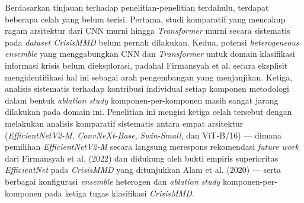 Berdasarkan tinjauan terhadap penelitian-penelitian terdahulu, terdapat
beberapa celah yang belum terisi. Pertama, studi komparatif yang
mencakup ragam arsitektur dari CNN murni hingga \textit{Transformer}
murni secara sistematis pada \textit{dataset CrisisMMD} belum pernah
dilakukan. Kedua, potensi \textit{heterogeneous ensemble} yang
menggabungkan CNN dan \textit{Transformer} untuk domain klasifikasi
informasi krisis belum dieksplorasi, padahal Firmansyah et al.
secara eksplisit mengidentifikasi hal ini sebagai arah pengembangan
yang menjanjikan. Ketiga, analisis sistematis terhadap kontribusi
individual setiap komponen metodologi dalam bentuk \textit{ablation
study} komponen-per-komponen masih sangat jarang dilakukan pada domain
ini. Penelitian ini mengisi ketiga celah tersebut dengan melakukan
analisis komparatif sistematis antara empat arsitektur
(\textit{EfficientNetV2-M}, \textit{ConvNeXt-Base}, \textit{Swin-Small},
dan ViT-B/16) — dimana pemilihan \textit{EfficientNetV2-M} secara
langsung merespons rekomendasi \textit{future work} dari Firmansyah
et al. (2022) dan didukung oleh bukti empiris superioritas
\textit{EfficientNet} pada \textit{CrisisMMD} yang ditunjukkan
Alam et al. (2020) — serta berbagai konfigurasi \textit{ensemble}
heterogen dan \textit{ablation study} komponen-per-komponen pada
ketiga tugas klasifikasi \textit{CrisisMMD}. \par

